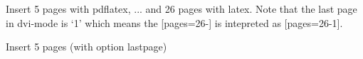 \documentclass[a4paper,\myClassOptions]{article}
\begin{document}
Insert 5 pages with pdflatex, ... and 26 pages with latex.
Note that the last page in dvi-mode is `1' which means the
[pages=26-] is intepreted as [pages=26-1].


Insert 5 pages (with option lastpage)

\end{document}
